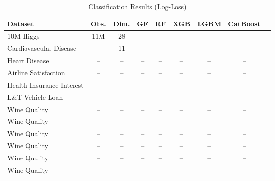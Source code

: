 \documentclass{article}
\begin{document}
\begin{table}[ht]
    \centering
    \caption{Classification Results (Log-Loss)}
    \begin{tabular}{lcccccccc}
    \hline
    Dataset & Obs. & Dim. & GF & RF & XGB & LGBM & CatBoost \\
    \hline
    10M Higgs & 11M & 28 & -- & -- & -- & -- & -- \\
    Cardiovascular Disease          & -- & 11 & -- & -- & -- & -- & -- \\
    Heart Disease          & -- & -- & -- & -- & -- & -- & -- \\
    Airline Satisfaction          & -- & -- & -- & -- & -- & -- & -- \\
    Health Insurance Interest          & -- & -- & -- & -- & -- & -- & -- \\
    L\&T Vehicle Loan          & -- & -- & -- & -- & -- & -- & -- \\
    Wine Quality          & -- & -- & -- & -- & -- & -- & -- \\
    Wine Quality          & -- & -- & -- & -- & -- & -- & -- \\
    Wine Quality          & -- & -- & -- & -- & -- & -- & -- \\
    Wine Quality          & -- & -- & -- & -- & -- & -- & -- \\
    Wine Quality          & -- & -- & -- & -- & -- & -- & -- \\
    Wine Quality          & -- & -- & -- & -- & -- & -- & -- \\
    \hline
    \end{tabular}
    \label{tab:classification_results}
    \end{table}
\end{document}
